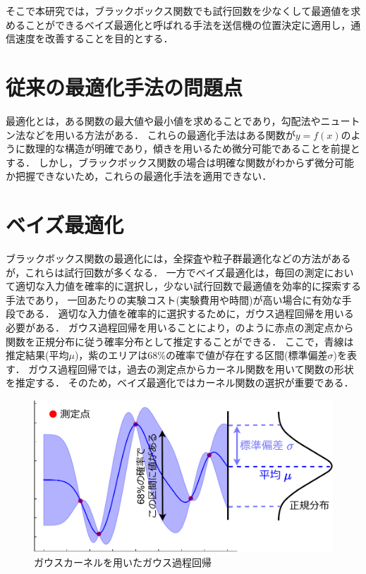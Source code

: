 \documentclass[twocolumn]{ltjarticle}
\begin{document}
そこで本研究では，ブラックボックス関数でも試行回数を少なくして最適値を求めることができるベイズ最適化と呼ばれる手法を送信機の位置決定に適用し，通信速度を改善することを目的とする．
\section{従来の最適化手法の問題点}

最適化とは，ある関数の最大値や最小値を求めることであり，勾配法やニュートン法などを用いる方法がある．
これらの最適化手法はある関数が\(y=f(x)\)のように数理的な構造が明確であり，傾きを用いるため微分可能であることを前提とする．
しかし，ブラックボックス関数の場合は明確な関数がわからず微分可能か把握できないため，これらの最適化手法を適用できない．
\section{ベイズ最適化}

ブラックボックス関数の最適化には，全探査や粒子群最適化などの方法があるが，これらは試行回数が多くなる．
一方でベイズ最適化は，毎回の測定において適切な入力値を確率的に選択し，少ない試行回数で最適値を効率的に探索する手法であり，
一回あたりの実験コスト(実験費用や時間)が高い場合に有効な手段である．
適切な入力値を確率的に選択するために，ガウス過程回帰を用いる必要がある．
ガウス過程回帰を用いることにより，のように赤点の測定点から関数を正規分布に従う確率分布として推定することができる．
ここで，青線は推定結果(平均\(\mu\))，紫のエリアは68\%の確率で値が存在する区間(標準偏差\(\sigma\))を表す．
ガウス過程回帰では，過去の測定点からカーネル関数を用いて関数の形状を推定する．
そのため，ベイズ最適化ではカーネル関数の選択が重要である．
\setlength\intextsep{3pt}
\setlength\textfloatsep{3pt}
\begin{figure}[htbp]
	\centering
	\includegraphics[width=0.83\linewidth]{./figures/material_5_kernel_v2.pdf}
	\vspace*{-0.3cm}
	\caption{ガウスカーネルを用いたガウス過程回帰} \label{fig:gaussian_process}
\end{figure}
\end{document}
